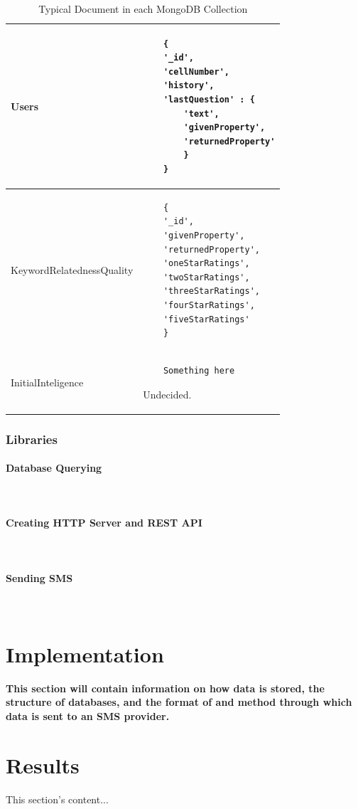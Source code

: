 \documentclass{article}
\newcommand{\myparagraph}[1]{\paragraph{#1}\mbox{}\\}
\begin{document}
\begin{table}
\begin{center}
    \begin{tabular}{| l | l |}
    \hline
    
    Users &
    \begin{lstlisting}
    {
    '_id',
    'cellNumber',
    'history',
    'lastQuestion' : {
        'text',
        'givenProperty',
        'returnedProperty'
        }
    }
    \end{lstlisting}
    \\ \hline
    
    KeywordRelatednessQuality &
    \begin{lstlisting}
    {
    '_id',
    'givenProperty',
    'returnedProperty',
    'oneStarRatings',
    'twoStarRatings',
    'threeStarRatings',
    'fourStarRatings',
    'fiveStarRatings'
    }
    \end{lstlisting}
    \\ \hline
    
    InitialInteligence &
    \begin{lstlisting}
    Something here
    \end{lstlisting}
    \color{red} Undecided.
    \\ \hline
    
    \end{tabular}
    \caption{Typical Document in each MongoDB Collection}
    \label{table:collectionStructure}
\end{center}
\end{table}

\subsubsection{Libraries}
\myparagraph{Database Querying}

\myparagraph{Creating HTTP Server and REST API}

\myparagraph{Sending SMS}

\newpage
\section{Implementation}
\label{sec:implementation}
{\bf This section will contain information on how data is stored, the structure of databases, and the format of and method through which data is sent to an SMS provider.}

\newpage
\section{Results}
\label{sec:results}
This section's content...
\end{document}
